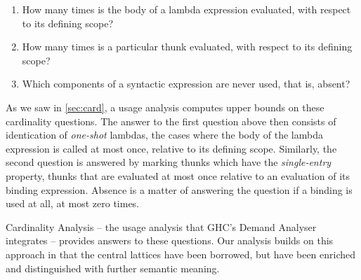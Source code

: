 \begin{enumerate}
  \item How many times is the body of a lambda expression evaluated, with respect to its defining scope?
  \item How many times is a particular thunk evaluated, with respect to its defining scope? 
  \item Which components of a syntactic expression are never used, that is, absent?
\end{enumerate}

As we saw in \cref{sec:card}, a usage analysis computes upper bounds on these cardinality questions.
The answer to the first question above then consists of identication of \emph{one-shot} lambdas, \eg the cases where the body of the lambda expression is called at most once, relative to its defining scope.
Similarly, the second question is answered by marking thunks which have the \emph{single-entry} property, \eg thunks that are evaluated at most once relative to an evaluation of its binding expression.
Absence is a matter of answering the question if a binding is used at all, \eg at most zero times.

Cardinality Analysis \parencite{card} -- the usage analysis that GHC's Demand Analyser integrates -- provides answers to these questions.
Our analysis builds on this approach in that the central lattices have been borrowed, but have been enriched and distinguished with further semantic meaning.

